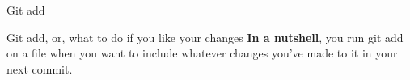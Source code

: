 \begin{frame}{Git add}
    \begin{block}{Git add, or, what to do if you like your changes}
    \textbf{In a nutshell}, you run git add on a file when you want to include whatever changes you've made to it in your next commit.
    
    \end{block}
    \pause
\end{frame}
